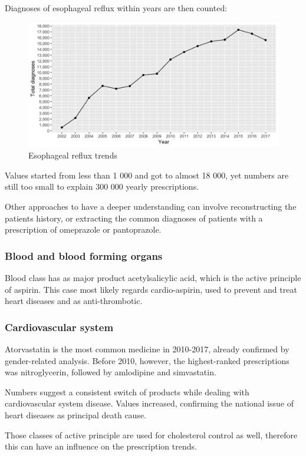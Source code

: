 Diagnoses of esophageal reflux within years are then counted:
\begin{figure}[h]
	\centering
	\includegraphics[scale=0.3]{../plots/reflux.png}
	\caption{\small Esophageal reflux trends}
\end{figure}

Values started from less than 1 000 and got to almost 18 000, yet numbers are still too small to explain 300 000 yearly prescriptions. 

Other approaches to have a deeper understanding can involve reconstructing the patients history, or extracting the common diagnoses of patients with a prescription of omeprazole or pantoprazole.

\subsubsection{Blood and blood forming organs}
Blood class has as major product acetylsalicylic acid, which is the active principle of aspirin. This case most likely regards cardio-aspirin, used to prevent and treat heart diseases and as anti-thrombotic.

\subsubsection{Cardiovascular system}
Atorvastatin is the most common medicine in 2010-2017, already confirmed by gender-related analysis. Before 2010, however, the highest-ranked prescriptions was nitroglycerin, followed by amlodipine and simvastatin. 

Numbers suggest a consistent switch of products while dealing with cardiovascular system disease. Values increased, confirming the national issue of heart diseases as principal death cause\cite{ansacuore}.

Those classes of active principle are used for cholesterol control as well, therefore this can have an influence on the prescription trends.

